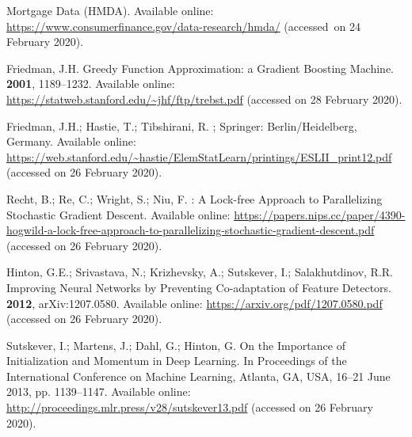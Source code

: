 \documentclass[information,article,accept,moreauthors,pdftex]{Definitions/mdpi}
\begin{document}
\begin{thebibliography}{999}
Mortgage Data ({H}{M}{D}{A}).
\newblock Available online:  \url{https://www.consumerfinance.gov/data-research/hmda/} ({accessed~on 24 February 2020}).

Friedman, J.H.
\newblock Greedy {F}unction {A}pproximation: a {G}radient {B}oosting {M}achine.
 {\bf 2001}, 1189--1232.
\newblock Available online: 
\url{https://statweb.stanford.edu/~jhf/ftp/trebst.pdf} (accessed on 28 February 2020).

Friedman, J.H.; Hastie, T.; Tibshirani, R.
; Springer: Berlin/Heidelberg, Germany.
\newblock Available online: 
  \url{https://web.stanford.edu/~hastie/ElemStatLearn/printings/ESLII\_print12.pdf} (accessed on 26 February 2020).

Recht, B.; Re, C.; Wright, S.; Niu, F.
: {A} {L}ock-free {A}pproach to {P}arallelizing
  {S}tochastic {G}radient {D}escent.
\newblock Available online: 
  \url{https://papers.nips.cc/paper/4390-hogwild-a-lock-free-approach-to-parallelizing-stochastic-gradient-descent.pdf}  (accessed on 26 February 2020).

Hinton, G.E.; Srivastava, N.; Krizhevsky, A.; Sutskever, I.; Salakhutdinov,
  R.R.
\newblock Improving {N}eural {N}etworks by {P}reventing {C}o-adaptation of
  {F}eature {D}etectors.
 {\bf 2012}, arXiv:1207.0580.
\newblock Available online: \url{https://arxiv.org/pdf/1207.0580.pdf}  (accessed on 26 February 2020).

Sutskever, I.; Martens, J.; Dahl, G.; Hinton, G.
\newblock On the {I}mportance of {I}nitialization and {M}omentum in {D}eep
  {L}earning.
\newblock  In Proceedings of the International Conference on Machine Learning, Atlanta, GA, USA, 16--21 June 2013, pp. 1139--1147. 
\newblock Available online: \url{http://proceedings.mlr.press/v28/sutskever13.pdf} (accessed on 26 February 2020).


\end{thebibliography}
\end{document}
